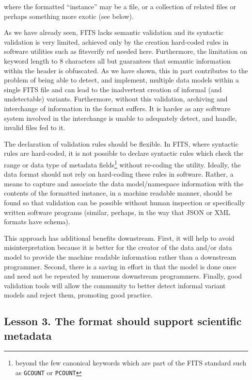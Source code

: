 \documentclass[final,authoryear,5p,times,twocolumn]{elsarticle}
\begin{document}
{{where the formatted ``instance'' may be a file, or a collection 
of related files or perhaps something more exotic (see below). 

As we have already seen, FITS lacks semantic validation and its
syntactic validation is very limited, achieved only by the creation
hard-coded rules in software utilities such as fitsverify
{\color{red} ref needed here}. Furthermore, the limitation on
keyword length to 8 characters all but guarantees that semantic
information within the header is obfuscated. As we have shown,
this in part contributes to the problem of being able to detect,
and implement, multiple data models within a single FITS file
and can lead to the inadvertent creation of informal (and
undetectable) variants. Furthermore, without this validation,
archiving and interchange of information in the format suffers.
It is harder as any software system involved in the interchange
is unable to adequately detect, and handle, invalid files fed to
it.

The declaration of validation rules should be flexible. In FITS,
where syntactic rules are hard-coded, it is not possible to
declare syntactic rules which check the range or data type of
metadata fields\footnote{beyond the few canonical keywords
which are part of the FITS standard such as \texttt{GCOUNT} 
or \texttt{PCOUNT}} without re-coding the utility.
Ideally, the data format should not rely on hard-coding these rules
in software. Rather, a means to capture and associate the data
model/namespace information with the contents of the formatted
instance, in a machine readable manner, should be found so that
validation can be possible without human inspection or specifically
written software programs (similar, perhaps, in the way that JSON
or XML formats have schema).


This approach has additional benefits downstream. First, it will help 
to avoid misinterpretation because it is better for the creator
of the data and/or data model to provide the machine readable information rather
than a downstream programmer. Second, there is a saving in effort
in that the model is done once and need not be repeated by numerous
downstream programmers. Finally, good validation tools will allow the community
to better detect informal variant models and reject them, promoting good
practice.


\subsection{Lesson 3. The format should support scientific metadata}

}}
\end{document}
